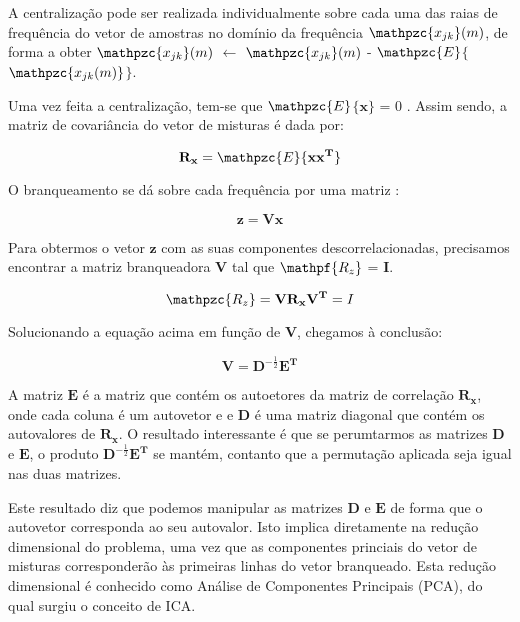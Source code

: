        A centralização pode ser realizada individualmente sobre cada uma das raias de frequência do vetor de amostras no domínio da frequência $\mathpzc{x_{jk}}(m)$, de forma a obter $\mathpzc{x_{jk}}(m)$ $\leftarrow$ $\mathpzc{x_{jk}}(m)$ - $\mathpzc{E}$$\{$$\mathpzc{x_{jk}(m)}$$\}$.
        
        Uma vez feita a centralização, tem-se que $\mathpzc{E}$$\{$$\mathbf{x}$$\}$ = 0 . Assim sendo, a matriz de covariância do vetor de misturas é dada por:
        
        \begin{equation}\label{eq:covariance}
            \mathbf{R_x} = \mathpzc{E}\{\mathbf{xx^T}\}
        \end{equation}
        
        O branqueamento se dá sobre cada frequência por uma matriz :
        
        \begin{equation}\label{eq:whiteningfrequency}
            \mathbf{z} = \mathbf{V}\mathbf{x}
        \end{equation}
        
        Para obtermos o vetor $\mathbf{z}$ com as suas componentes descorrelacionadas, precisamos encontrar a matriz branqueadora $\mathbf{V}$ tal que $\mathpf{R_z}$ = $\mathbf{I}$.

        \begin{equation}
            \label{whiteningproof}
        \mathpzc{R_z} = \mathbf{V}\mathbf{R_x}\mathbf{V^T} = I 
        \end{equation}

        Solucionando a equação acima em função de $\mathbf{V}$, chegamos à conclusão:
        
        \begin{equation}\label{eq:vk}
            \mathbf{V} = \mathbf{D}^{-\frac{1}{2}}\mathbf{E^T}
        \end{equation}
        
        A matriz $\mathbf{E}$ é a matriz que contém os autoetores da matriz de correlação $\mathbf{R_x}$, onde cada coluna é um autovetor e e $\mathbf{D}$ é uma matriz diagonal que contém os autovalores de $\mathbf{R_x}$. O resultado interessante é que se perumtarmos as matrizes $\mathbf{D}$ e $\mathbf{E}$, o produto $\mathbf{D}^{-\frac{1}{2}}\mathbf{E^T}$ se mantém, contanto que a permutação aplicada seja igual nas duas matrizes.
        
        Este resultado diz que podemos manipular as matrizes $\mathbf{D}$ e $\mathbf{E}$ de forma que o autovetor corresponda ao seu autovalor. Isto implica diretamente na redução dimensional do problema, uma vez que as componentes princiais do vetor de misturas corresponderão às primeiras linhas do vetor branqueado. Esta redução dimensional é conhecido como Análise de Componentes Principais (PCA), do qual surgiu o conceito de ICA. 
        
